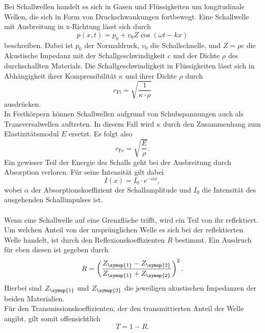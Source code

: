 \label{sec:Schallwellen}
Bei Schallwellen handelt es sich in Gasen und Flüssigkeiten um longitudinale Wellen, die sich in Form von Druckschwankungen fortbewegt.
Eine Schallwelle mit Ausbreitung in x-Richtung lässt sich durch
\begin{equation}
    p(x, t) = p_0 + v_0 Z \cos{(\omega t - kx)}
\end{equation}
beschreiben. Dabei ist $p_0$ der Normaldruck, $v_0$ die Schallschnelle, und $Z=\rho c$ die Akustische
Impedanz mit der Schallgeschwindigkeit $c$ und der Dichte $\rho$ des durchschallten Materials.
Die Schallgeschwindigkeit in Flüssigkeiten lässt sich in Abhängigkeit ihrer Kompressibilität $\kappa$ und ihrer
Dichte $\rho$ durch
\begin{equation}
    c_{\mathrm{Fl}} = \sqrt{\frac{1}{\kappa \cdot \rho}}
\end{equation}
ausdrücken. \\
In Festkörpern können Schallwellen aufgrund von Schubspannungen auch als Transversalwellen auftreten. In diesem Fall wird 
$\kappa$ durch den Zusammenhang zum Elastizitätsmodul $E$ ersetzt. Es folgt also
\begin{equation}
    c_{\mathrm{Fe}} = \sqrt{\frac{E}{\rho}}.
\end{equation}
Ein gewisser Teil der Energie des Schalls geht bei der Ausbreitung durch Absorption verloren. Für seine Intensität gilt dabei
\begin{equation}
    \label{eqn:Dämpfung}
    I(x) = I_0 \cdot e^{-\alpha x},
\end{equation}
wobei $\alpha$ der Absorptionskoeffizient der Schallamplitude und $I_0$ die Intensität des ausgehenden 
Schallimpulses ist.\\
\\
Wenn eine Schallwelle auf eine Grenzfläche trifft, wird ein Teil von ihr reflektiert. Um welchen Anteil von der ursprünglichen Welle es sich bei der
reflektierten Welle handelt, ist durch den Reflexionskoeffizienten $R$ bestimmt. Ein Ausdruch für eben diesen ist gegeben durch
\begin{equation}
    R = \left(\frac{Z_{\symup{1}}- Z_{\symup{2}}}{Z_{\symup{1}}+Z_{\symup{2}}}\right)^2.
\end{equation}
Hierbei sind $Z_{\symup{1}}$ und $Z_{\symup{2}}$ die jeweiligen akustischen Impedanzen der beiden Materialien. \\
Für den Transmissionskoeffizienten, der den transmittierten Anteil der Welle angibt, gilt somit offensichtlich
\begin{equation}
    T = 1 - R.
\end{equation}


